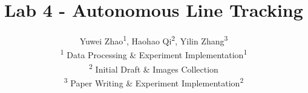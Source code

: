 \title{
  \textbf{Lab 4 - Autonomous Line Tracking}
}
\author{
  Yuwei Zhao\textsuperscript{1},
  Haohao Qi\textsuperscript{2},
  Yilin Zhang\textsuperscript{3} \\
  \small\textsuperscript{1}
  Data Processing \& Experiment Implementation\textsuperscript{1} \\
  \small\textsuperscript{2}
  Initial Draft \& Images Collection \\
  \small\textsuperscript{3}
  Paper Writing \& Experiment Implementation\textsuperscript{2}
}
\date{}